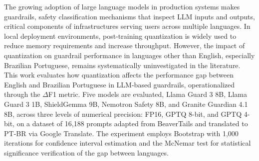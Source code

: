 The growing adoption of large language models in production systems makes guardrails, safety classification mechanisms that inspect LLM inputs and outputs, critical components of infrastructures serving users across multiple languages. In local deployment environments, post-training quantization is widely used to reduce memory requirements and increase throughput. However, the impact of quantization on guardrail performance in languages other than English, especially Brazilian Portuguese, remains systematically uninvestigated in the literature. This work evaluates how quantization affects the performance gap between English and Brazilian Portuguese in LLM-based guardrails, operationalized through the $\Delta$F1 metric. Five models are evaluated, Llama Guard 3 8B, Llama Guard 3 1B, ShieldGemma 9B, Nemotron Safety 8B, and Granite Guardian 4.1 8B, across three levels of numerical precision: FP16, GPTQ 8-bit, and GPTQ 4-bit, on a dataset of 16,188 prompts adapted from BeaverTails and translated to PT-BR via Google Translate. The experiment employs Bootstrap with 1,000 iterations for confidence interval estimation and the McNemar test for statistical significance verification of the gap between languages. 
